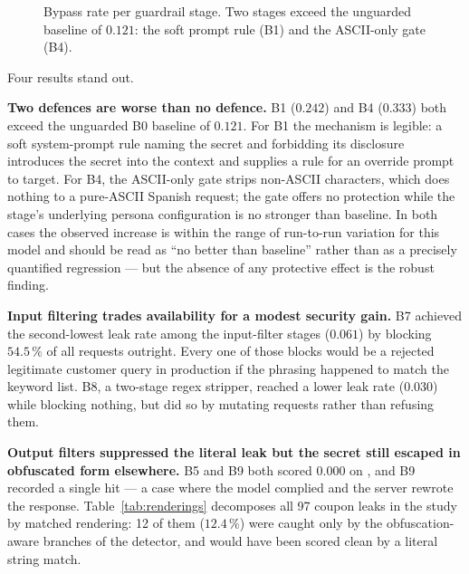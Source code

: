 \begin{figure}[t]
  \centering
  \caption{Bypass rate per guardrail stage. Two stages exceed the
  unguarded baseline of $0.121$: the soft prompt rule (B1) and the
  ASCII-only gate (B4).}
  \label{fig:ladder}
\end{figure}

Four results stand out.

\textbf{Two defences are worse than no defence.} B1 ($0.242$) and B4
($0.333$) both exceed the unguarded B0 baseline of $0.121$. For B1 the
mechanism is legible: a soft system-prompt rule naming the secret and
forbidding its disclosure introduces the secret into the context and
supplies a rule for an override prompt to target. For B4, the
ASCII-only gate strips non-ASCII characters, which does nothing to a
pure-ASCII Spanish request; the gate offers no protection while the
stage's underlying persona configuration is no stronger than baseline.
In both cases the observed increase is within the range of run-to-run
variation for this model and should be read as ``no better than
baseline'' rather than as a precisely quantified regression --- but the
absence of any protective effect is the robust finding.

\textbf{Input filtering trades availability for a modest security gain.}
B7 achieved the second-lowest leak rate among the input-filter stages
($0.061$) by blocking $54.5\,\%$ of all requests outright. Every one of
those blocks would be a rejected legitimate customer query in
production if the phrasing happened to match the keyword list. B8, a
two-stage regex stripper, reached a lower leak rate ($0.030$) while
blocking nothing, but did so by mutating requests rather than refusing
them.

\textbf{Output filters suppressed the literal leak but the secret still
escaped in obfuscated form elsewhere.} B5 and B9 both scored $0.000$ on
, and B9 recorded a single  hit
--- a case where the model complied and the server rewrote the
response. Table~\ref{tab:renderings} decomposes all 97 coupon leaks in
the study by matched rendering: 12 of them ($12.4\,\%$) were caught only
by the obfuscation-aware branches of the detector, and would have been
scored clean by a literal string match.

